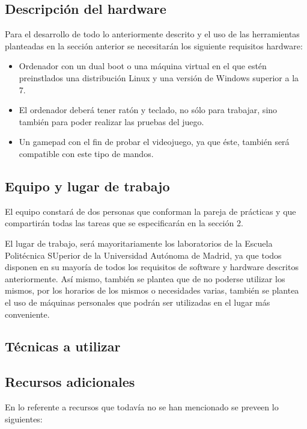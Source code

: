 \documentclass[a4paper]{article}
\begin{document}
\subsection{Descripción del hardware}
Para el desarrollo de todo lo anteriormente descrito y el uso de las herramientas planteadas en la sección anterior se necesitarán los siguiente requisitos hardware:

\begin{itemize}
	\item Ordenador con un dual boot o una máquina virtual en el que estén preinstlados una distribución Linux y una versión de Windows superior a la 7.
	\item El ordenador deberá tener ratón y teclado, no sólo para trabajar, sino también para poder realizar las pruebas del juego.
	\item Un gamepad con el fin de probar el videojuego, ya que éste, también será compatible con este tipo de mandos.
\end{itemize}



\subsection{Equipo y lugar de trabajo}

El equipo constará de dos personas que conforman la pareja de prácticas y que compartirán todas las tareas que se especificarán en la sección 2.

El lugar de trabajo, será mayoritariamente los laboratorios de la Escuela Politécnica SUperior de la Universidad Autónoma de Madrid, ya que todos disponen en su mayoría de todos los requisitos de software y hardware descritos anteriormente. Así mismo, también se plantea que de no poderse utilizar los mismos, por los horarios de los mismos o necesidades varias, también se plantea el uso de máquinas personales que podrán ser utilizadas en el lugar más conveniente.


\subsection{Técnicas a utilizar}

\subsection{Recursos adicionales}
En lo referente a recursos que todavía no se han mencionado se preveen lo siguientes:
\end{document}
